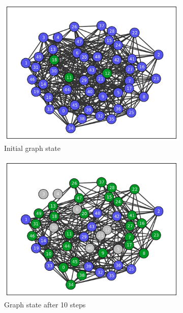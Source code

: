 \documentclass[11pt]{article} %
\begin{document}
\begin{figure}[t]
  \begin{subfigure}[b]{0.5\textwidth}
    \centering
    \includegraphics[width=\textwidth]{figures/ER_evo_50_03_init}
    \caption{Initial graph state}
  \end{subfigure}
  \begin{subfigure}[b]{0.5\textwidth}
    \centering
    \includegraphics[width=\textwidth]{figures/ER_evo_50_03_10}
    \caption{Graph state after 10 steps}
  \end{subfigure}
  \begin{subfigure}[b]{0.5\textwidth}
    \centering

\end{subfigure}
\end{figure}
\end{document}
